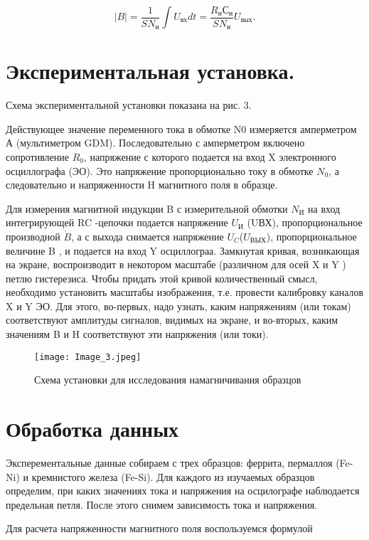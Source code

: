$$ |B|=\dfrac{1}{SN_{и}}\int U_{вх}dt=\dfrac{R_{и}С_{и}}{SN_{и}}U_{вых}.$$

\section{Экспериментальная установка.}
Схема экспериментальной установки показана на рис. 3.

Действующее значение переменного тока в обмотке N0 измеряется амперметром А (мультиметром GDM). Последовательно с амперметром включено сопротивление $R_{0}$, напряжение с которого подается на вход X электронного осциллографа (ЭО). Это напряжение пропорционально току в обмотке $N_{0}$, а следовательно и напряженности H магнитного поля в образце.

Для измерения магнитной индукции B с измерительной обмотки $N_{И}$ на вход интегрирующей RC -цепочки подается напряжение $U_{И}$ (UВХ), пропорциональное производной $\dot{B}$, а с выхода снимается напряжение $U_{C}$($U_{ВЫХ}$), пропорциональное
величине B , и подается на вход Y осциллограа.
Замкнутая кривая, возникающая на экране, воспроизводит в некотором масштабе (различном для осей X и Y ) петлю гистерезиса. Чтобы придать этой кривой количественный смысл, необходимо установить масштабы изображения, т.е. провести калибровку каналов X и Y ЭО. Для этого, во-первых, надо узнать, каким напряжениям (или токам) соответствуют амплитуды сигналов, видимых на экране, и во-вторых,  каким значениям B и H соответствуют эти напряжения
(или токи).

\newpage

\begin{figure}[h!]
	\centering
	\texttt{[image: Image\_3.jpeg]}
	\caption{Схема установки для исследования намагничивания образцов}
	\label{fig:Holl2}
\end{figure}

\newpage

\section{Обработка данных}

Эксперементальные данные собираем с трех образцов: феррита, пермаллоя (Fe-Ni) и кремнистого железа (Fe-Si).
Для каждого из изучаемых образцов определим, при каких значениях тока и напряжения на осцилографе наблюдается предельная петля.
После этого снимем зависимость тока и напряжения.

Для расчета напряженности магнитного поля воспользуемся формулой

